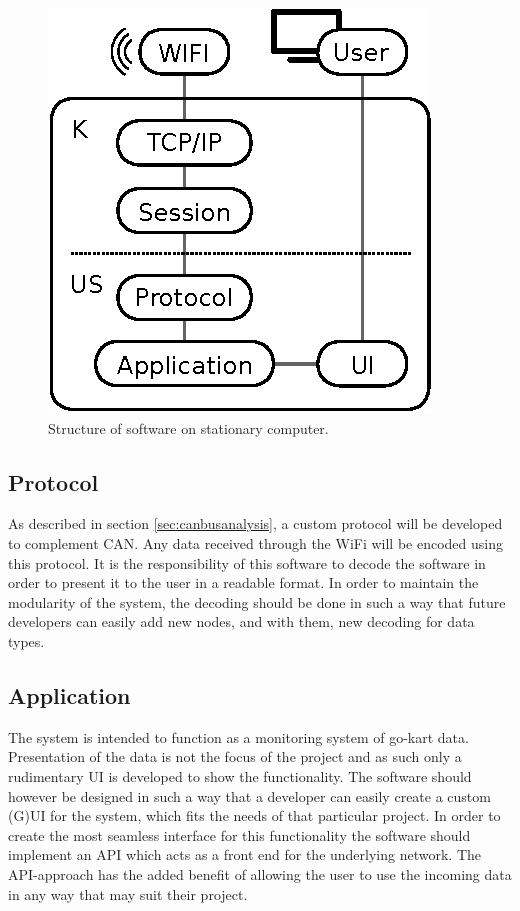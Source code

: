 \begin{figure}[h]
	\centering
	\includegraphics[width = 0.4\linewidth]{graphics/stationary_software.eps}
	\caption{Structure of software on stationary computer.}
	\label{fig:setup_ui}
\end{figure}

\subsection{Protocol}
As described in section \ref{sec:canbusanalysis}, a custom protocol will be developed to complement CAN.
Any data received through the WiFi will be encoded using this protocol.
It is the responsibility of this software to decode the software in order to present it to the user in a readable format.
In order to maintain the modularity of the system, the decoding should be done in such a way that future developers can easily add new nodes, and with them, new decoding for data types.

\subsection{Application}
The system is intended to function as a monitoring system of go-kart data.
Presentation of the data is not the focus of the project and as such only a rudimentary UI is developed to show the functionality.
The software should however be designed in such a way that a developer can easily create a custom (G)UI for the system, which fits the needs of that particular project.
In order to create the most seamless interface for this functionality the software should implement an API which acts as a front end for the underlying network.
The API-approach has the added benefit of allowing the user to use the incoming data in any way that may suit their project.

